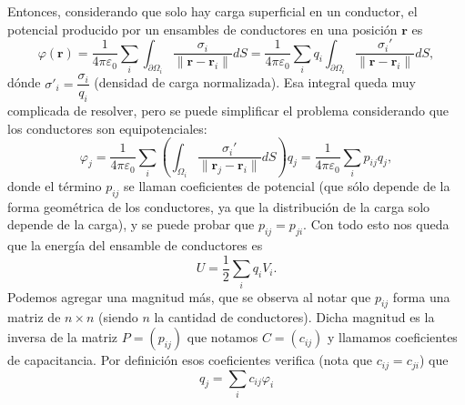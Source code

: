 \documentclass[11pt,a4paper]{article}
\numberwithin{equation}{section}
\begin{document}
Entonces, considerando que solo hay carga superficial en un conductor, el potencial producido por un ensambles de conductores en una posición $\textbf{r}$ es
\begin{equation}
    \varphi(\textbf{r}) = \frac{1}{4\pi\varepsilon_0} \sum_i \int_{\partial \Omega_i} \frac{\sigma_i}{\| \textbf{r} - \textbf{r}_i \|} dS = \frac{1}{4\pi\varepsilon_0} \sum_i q_i \int_{\partial \Omega_i} \frac{\sigma_i'}{\|\textbf{r} - \textbf{r}_i\|} dS,
    \label{eq:e_potencial_conductores}
\end{equation}
dónde $\sigma'_i = \dfrac{\sigma_i}{q_i}$ (densidad de carga normalizada). Esa integral queda muy complicada de resolver, pero se puede simplificar el problema considerando que los conductores son equipotenciales:
\begin{equation}
    \varphi_j = \frac{1}{4\pi\varepsilon_0} \sum_i \left( \int_{\Omega_i} \frac{\sigma_i'}{\| \textbf{r}_j - \textbf{r}_i \|} dS \right) q_j = \frac{1}{4\pi\varepsilon_0} \sum_i p_{ij} q_j,
    \label{eq:e_potencial_conductores_coeff}
\end{equation}
donde el término $p_{ij}$ se llaman coeficientes de potencial (que sólo depende de la forma geométrica de los conductores, ya que la distribución de la carga solo depende de la carga), y se puede probar que $p_{ij} = p_{ji}$. Con todo esto nos queda que la energía del ensamble de conductores es 
\begin{equation}
    U = \frac{1}{2} \sum_i q_i V_i.
    \label{eq:e_energia_conductores}
\end{equation}
Podemos agregar una magnitud más, que se observa al notar que $p_{ij}$ forma una matriz de $n \times n$ (siendo $n$ la cantidad de conductores). Dicha magnitud es la inversa de la matriz $P = (p_{ij})$ que notamos $C = (c_{ij})$ y llamamos coeficientes de capacitancia. Por definición esos coeficientes verifica (nota que $c_{ij} = c_{ji}$) que
\begin{equation}
    q_j = \sum_i c_{ij} \varphi_i
    \label{eq:e_potencial_conductores_coeff_capacidad}
\end{equation}
\end{document}
